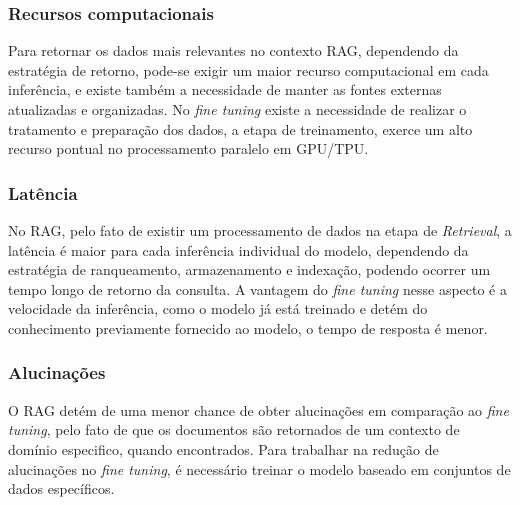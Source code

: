 \subsubsection{Recursos computacionais}
\label{resources}
Para retornar os dados mais relevantes no contexto RAG, dependendo da estratégia de retorno, pode-se exigir um maior recurso computacional em cada inferência, e existe também a necessidade de manter as fontes externas atualizadas e organizadas. No \textit{fine tuning} existe a necessidade de realizar o tratamento e preparação dos dados, a etapa de treinamento, exerce um alto recurso pontual no processamento paralelo em GPU/TPU.

\subsubsection{Latência}
\label{latency}
No RAG, pelo fato de existir um processamento de dados na etapa de \textit{Retrieval}, a latência é maior para cada inferência individual do modelo, dependendo da estratégia de ranqueamento, armazenamento e indexação, podendo ocorrer um tempo longo de retorno da consulta. A vantagem do \textit{fine tuning} nesse aspecto é a velocidade da inferência, como o modelo já está treinado e detém do conhecimento previamente fornecido ao modelo, o tempo de resposta é menor.

\subsubsection{Alucinações}
\label{alucinations}
O RAG detém de uma menor chance de obter alucinações em comparação ao \textit{fine tuning}, pelo fato de que os documentos são retornados de um contexto de domínio especifico, quando encontrados. Para trabalhar na redução de alucinações no \textit{fine tuning}, é necessário treinar o modelo baseado em conjuntos de dados específicos.
